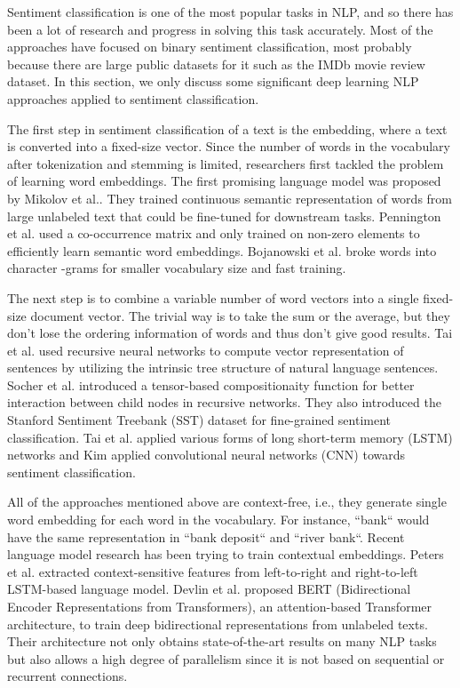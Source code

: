 \documentclass[conference]{IEEEtran}
\begin{document}
Sentiment classification is one of the most popular tasks in NLP, and so there has been a lot of research and progress in solving this task accurately. Most of the approaches have focused on binary sentiment classification, most probably because there are large public datasets for it such as the IMDb movie review dataset\cite{imdb-dataset}. In this section, we only discuss some significant deep learning NLP approaches applied to sentiment classification.

The first step in sentiment classification of a text is the embedding, where a text is converted into a fixed-size vector. Since the number of words in the vocabulary after tokenization and stemming is limited, researchers first tackled the problem of learning word embeddings. The first promising language model was proposed by Mikolov et al.\cite{wordvec}. They trained continuous semantic representation of words from large unlabeled text that could be fine-tuned for downstream tasks. Pennington et al.\cite{glove} used a co-occurrence matrix and only trained on non-zero elements to efficiently learn semantic word embeddings. Bojanowski et al.\cite{fasttext} broke words into character -grams for smaller vocabulary size and fast training.

The next step is to combine a variable number of word vectors into a single fixed-size document vector. The trivial way is to take the sum or the average, but they don't lose the ordering information of words and thus don't give good results. Tai et al.\cite{rnn-sentiment} used recursive neural networks to compute vector representation of sentences by utilizing the intrinsic tree structure of natural language sentences. Socher et al.\cite{rntn} introduced a tensor-based compositionaity function for better interaction between child nodes in recursive networks. They also introduced the Stanford Sentiment Treebank (SST) dataset for fine-grained sentiment classification. Tai et al.\cite{lstm} applied various forms of long short-term memory (LSTM) networks and Kim\cite{cnn} applied convolutional neural networks (CNN) towards sentiment classification.

All of the approaches mentioned above are context-free, i.e., they generate single word embedding for each word in the vocabulary. For instance, ``bank`` would have the same representation in ``bank deposit`` and ``river bank``. Recent language model research has been trying to train contextual embeddings. Peters et al.\cite{elmo} extracted context-sensitive features from left-to-right and right-to-left LSTM-based language model. Devlin et al.\cite{bert} proposed BERT (Bidirectional Encoder Representations from Transformers), an attention-based Transformer architecture\cite{attention}, to train deep bidirectional representations from unlabeled texts. Their architecture not only obtains state-of-the-art results on many NLP tasks but also allows a high degree of parallelism since it is not based on sequential or recurrent connections.
\end{document}
